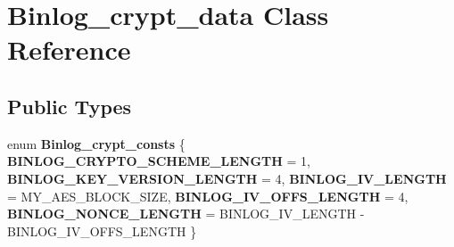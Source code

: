 \hypertarget{classBinlog__crypt__data}{}\section{Binlog\+\_\+crypt\+\_\+data Class Reference}
\label{classBinlog__crypt__data}
\subsection*{Public Types}
\begin{DoxyCompactItemize}
\item 
\mbox{\label{classBinlog__crypt__data_a6e6bc7dec66e1348ae66cd100c32e43c}} 
enum {\bfseries Binlog\+\_\+crypt\+\_\+consts} \{ \newline
{\bfseries B\+I\+N\+L\+O\+G\+\_\+\+C\+R\+Y\+P\+T\+O\+\_\+\+S\+C\+H\+E\+M\+E\+\_\+\+L\+E\+N\+G\+TH} = 1, 
{\bfseries B\+I\+N\+L\+O\+G\+\_\+\+K\+E\+Y\+\_\+\+V\+E\+R\+S\+I\+O\+N\+\_\+\+L\+E\+N\+G\+TH} = 4, 
{\bfseries B\+I\+N\+L\+O\+G\+\_\+\+I\+V\+\_\+\+L\+E\+N\+G\+TH} = M\+Y\+\_\+\+A\+E\+S\+\_\+\+B\+L\+O\+C\+K\+\_\+\+S\+I\+ZE, 
{\bfseries B\+I\+N\+L\+O\+G\+\_\+\+I\+V\+\_\+\+O\+F\+F\+S\+\_\+\+L\+E\+N\+G\+TH} = 4, 
\newline
{\bfseries B\+I\+N\+L\+O\+G\+\_\+\+N\+O\+N\+C\+E\+\_\+\+L\+E\+N\+G\+TH} = B\+I\+N\+L\+O\+G\+\_\+\+I\+V\+\_\+\+L\+E\+N\+G\+TH -\/ B\+I\+N\+L\+O\+G\+\_\+\+I\+V\+\_\+\+O\+F\+F\+S\+\_\+\+L\+E\+N\+G\+TH
 \}
\end{DoxyCompactItemize}
